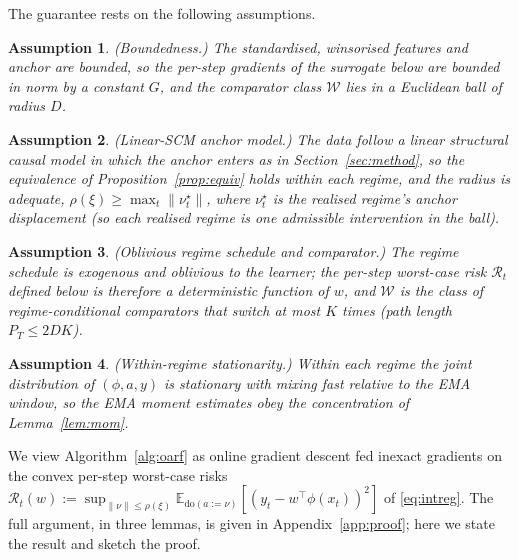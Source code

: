 \documentclass[12pt]{article}
\theoremstyle{plain}
\newtheorem{assumption}{Assumption}
\theoremstyle{remark}
\newcommand{\E}{\mathbb{E}}
\newcommand{\doop}{\mathrm{do}}
\begin{document}
The guarantee rests on the following assumptions.

\begin{assumption}\label{ass:bounded} (Boundedness.) The standardised, winsorised
features and anchor are bounded, so the per-step gradients of the surrogate below are
bounded in norm by a constant $G$, and the comparator class $\mathcal{W}$ lies in a
Euclidean ball of radius $D$.
\end{assumption}
\begin{assumption}\label{ass:scm} (Linear-SCM anchor model.) The data follow a linear
structural causal model in which the anchor enters as in Section~\ref{sec:method},
so the equivalence of Proposition~\ref{prop:equiv} holds within each regime, and the
radius is adequate, $\rho(\xi)\ge\max_t\|\nu_t^\star\|$, where $\nu_t^\star$ is the
realised regime's anchor displacement (so each realised regime is one admissible
intervention in the ball).
\end{assumption}
\begin{assumption}\label{ass:comp} (Oblivious regime schedule and comparator.) The
regime schedule is exogenous and oblivious to the learner; the per-step worst-case
risk $\mathcal{R}_t$ defined below is therefore a deterministic function of $w$, and
$\mathcal{W}$ is the class of regime-conditional comparators that switch at most $K$
times (path length $P_T\le 2DK$).
\end{assumption}
\begin{assumption}\label{ass:moment} (Within-regime stationarity.) Within each regime
the joint distribution of $(\phi,a,y)$ is stationary with mixing fast relative to the
EMA window, so the EMA moment estimates obey the concentration of Lemma~\ref{lem:mom}.
\end{assumption}

We view Algorithm~\ref{alg:oarf} as online gradient descent fed inexact gradients on
the convex per-step worst-case risks
$\mathcal{R}_t(w):=\sup_{\|\nu\|\le\rho(\xi)}\E_{\doop(a:=\nu)}[(y_t-w^\top\phi(x_t))^2]$
of \eqref{eq:intreg}. The full argument, in three lemmas, is given in
Appendix~\ref{app:proof}; here we state the result and sketch the proof.
\end{document}
